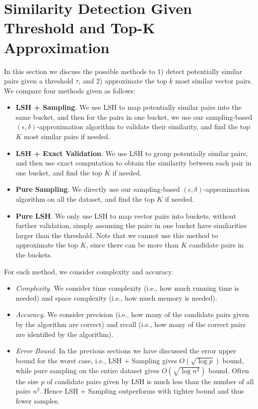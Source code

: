 \documentclass[sigconf,anonymous]{acmart}
\begin{document}
\section{Similarity Detection Given Threshold and Top-K Approximation}
\label{sec:cmp}
In this section we discuss the possible methods to 1) detect potentially similar pairs given a threshold $\tau$, and 2) approximate the top $k$ most similar vector pairs. We compare four methods given as follows:
\begin{itemize}
\item {\bf LSH + Sampling}. We use LSH to map potentially similar pairs into the same bucket, and then for the pairs in one bucket, we use our sampling-based $(\epsilon, \delta)$-approximation algorithm to validate their similarity, and find the top $K$ most similar pairs if needed.
\item {\bf LSH + Exact Validation}. We use LSH to group potentially similar pairs, and then use exact computation to obtain the similarity between each pair in one bucket, and find the top $K$ if needed.
\item {\bf Pure Sampling}. We directly use our sampling-based $(\epsilon, \delta)$-approximation algorithm on all the dataset, and find the top $K$ if needed.
\item {\bf Pure LSH}. We only use LSH to map vector pairs into buckets, without further validation, simply assuming the pairs in one bucket have similarities larger than the threshold. Note that we cannot use this method to approximate the top $K$, since there can be more than $K$ candidate pairs in the buckets.
\end{itemize}
For each method, we consider complexity and accuracy.
\begin{itemize}
\item \emph{Complexity}. We consider time complexity (i.e., how much running time is needed) and space complexity (i.e., how much memory is needed).
\item \emph{Accuracy}. We consider precision (i.e., how many of the candidate pairs given by the algorithm are correct) and recall (i.e., how many of the correct pairs are identified by the algorithm). 
\item \emph{Error Bound}. In the previous sections we have discussed the error upper bound for the worst case, i.e., LSH + Sampling gives $O(\sqrt{\log p})$ bound, while pure sampling on the entire dataset gives $O(\sqrt{\log n^2})$ bound. Often the size $p$ of candidate pairs given by LSH is much less than the number of all pairs $n^2$. Hence LSH + Sampling outperforms with tighter bound and thus fewer samples.
\end{itemize}
\end{document}
